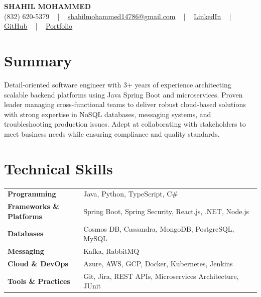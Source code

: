 \documentclass[letterpaper,11pt]{article}
\begin{document}
\begin{center}
    {\fontsize{14pt}{12pt}\selectfont \textbf{\MakeUppercase{Shahil Mohammed}}}\\ \vspace{2pt}
    \fontsize{10pt}{12pt}\selectfont (832) 620-5379 ~ | ~ \href{mailto:shahilmohammed14786@gmail.com}{shahilmohammed14786@gmail.com} ~ | ~  
    \href{https://www.linkedin.com/in/shahil-mohammed-9652931a1/}{\color{blue}\underline{LinkedIn}}  ~ | ~ 
    \href{https://github.com/freakbeast14}{\color{blue}\underline{GitHub}} ~ | ~ 
    \href{https://shahil-mohammed.netlify.app/}{\color{blue}\underline{Portfolio}}
    \vspace{-8pt}
\end{center}

\section{Summary}
\fontsize{9pt}{10pt}\selectfont
Detail-oriented software engineer with 3+ years of experience architecting scalable backend platforms using Java Spring Boot and microservices. Proven leader managing cross-functional teams to deliver robust cloud-based solutions with strong expertise in NoSQL databases, messaging systems, and troubleshooting production issues. Adept at collaborating with stakeholders to meet business needs while ensuring compliance and quality standards.
 \vspace{-5pt}
 
\section{Technical Skills}
        \vspace{-14pt}
        \begin{table}[h]
            \fontsize{9pt}{10pt}\selectfont
            \begin{tabular}{p{0.3\linewidth} p{0.7\linewidth}}
                \textbf{Programming} & Java, Python, TypeScript, C\# \\
                \textbf{Frameworks \& Platforms} & Spring Boot, Spring Security, React.js, .NET, Node.js \\
                \textbf{Databases} & Cosmos DB, Cassandra, MongoDB, PostgreSQL, MySQL \\
                \textbf{Messaging} & Kafka, RabbitMQ \\
                \textbf{Cloud \& DevOps} & Azure, AWS, GCP, Docker, Kubernetes, Jenkins \\
                \textbf{Tools \& Practices} & Git, Jira, REST APIs, Microservices Architecture, JUnit \\
            \end{tabular}
        \end{table}
 \vspace{-15pt}
 
\end{document}
